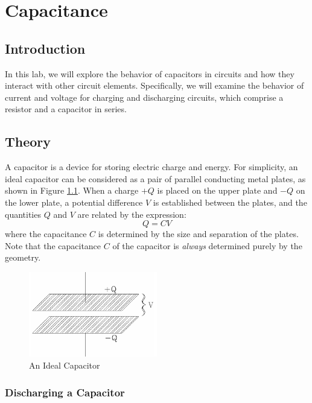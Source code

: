 \chapter{Capacitance}

\section{Introduction}

In this lab, we will explore the behavior of capacitors in circuits and how they interact with other circuit elements. Specifically, we will examine the behavior of current and voltage for charging and discharging  circuits, which comprise a resistor and a capacitor in series.

\section{Theory}

A capacitor is a device for storing electric charge and energy. For simplicity, an ideal capacitor can be considered as a pair of parallel conducting metal plates, as shown in Figure \ref{fig:capacitor}. When a charge $+Q$ is placed on the upper plate and $-Q$ on the lower plate, a potential difference $V$ is established between the plates, and the quantities $Q$ and $V$ are related by the expression:
\begin{equation}
    Q = CV
\end{equation}
where the capacitance $C$ is determined by the size and separation of the plates. Note that the capacitance $C$ of the capacitor is \emph{always} determined purely by the geometry.

\begin{figure}[h]
    \begin{center}
        \includegraphics[width=0.5\textwidth]{./Exp3/pic/image1.png}
    \end{center}
    \caption{An Ideal Capacitor}
    \label{fig:capacitor}
\end{figure}

\subsection{Discharging a Capacitor}

